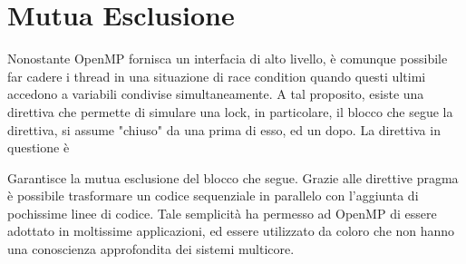 \documentclass[10pt, letterpaper]{report}
\begin{document}
\section{Mutua Esclusione}
Nonostante OpenMP fornisca un interfacia di alto livello, è comunque possibile far cadere i thread in una situazione di race condition quando questi ultimi accedono a variabili condivise simultaneamente. A tal proposito, esiste una direttiva che permette di simulare una lock, in particolare, il blocco che segue la direttiva, si assume "chiuso" da una  prima di esso, ed un  dopo. La direttiva in questione è\begin{quote}
\end{quote}
Garantisce la mutua esclusione del blocco che segue.\acc 
Grazie alle direttive pragma è possibile trasformare un codice sequenziale in parallelo con l'aggiunta di pochissime linee di codice. Tale semplicità ha permesso ad OpenMP di essere adottato in moltissime applicazioni, ed essere utilizzato da coloro che non hanno una conoscienza approfondita dei sistemi multicore.
\end{document}
